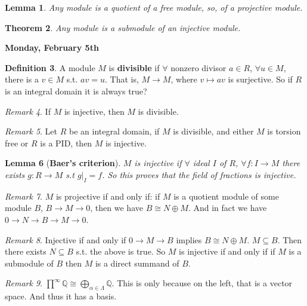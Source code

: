\documentclass[12pt]{amsbook}
\theoremstyle{plain}
\newtheorem{theorem}{Theorem}[chapter]
\numberwithin{section}{chapter}
\numberwithin{equation}{chapter}
\newtheorem{lem}[theorem]{Lemma}
\theoremstyle{definition}
\newtheorem{Def}[theorem]{Definition}
\theoremstyle{remark}
\newtheorem{rem}[theorem]{Remark}
\newcommand{\sub}{\subseteq}
\newcommand{\Q}{\mathbb{Q}}
\begin{document}
\begin{lem}
Any module is a quotient of a free module, so, of a projective module. 
\end{lem}

\begin{theorem}
Any module is a submodule of an injective module. 
\end{theorem}


\textbf{Monday, February 5th}


\begin{Def}
A module $M$ is \textbf{divisible} if $\forall$ nonzero divisor $a \in R$, $\forall u \in M$, there is a $v \in M$ s.t. $av = u$. That is, $M  \to M$, where $v \mapsto av$ is surjective. So if $R$ is an integral domain it is always true?
\end{Def}

\begin{rem}
If $M$ is injective, then $M$ is divisible. 
\end{rem}

\begin{rem}
Let $R$ be an integral domain, if $M$ is divisible, and either $M$ is torsion free or $R$ is a PID, then $M$ is injective. 
\end{rem}

\begin{lem}[\textbf{Baer's criterion}]
$M$ is injective if $\forall$ ideal $I$ of $R$, $\forall f: I \to M$ there exists $g:R \to M$ s.t $g|_I = f$. So this proves that the field of fractions is injective. 
\end{lem}

\begin{rem}
$M$ is projective if and only if: if $M$ is a quotient module of some module $B$, $B \to M \to 0$, then we have $B \cong N \oplus M$. And in fact we have $0 \to N \to B \to M \to 0$. 
\end{rem}

\begin{rem}
Injective if and only if $0 \to M \to B$ implies $B \cong N \oplus M$. $M \sub B$. Then there exists $N \sub B$ s.t. the above is true. So $M$ is injective if and only if if $M$ is a submodule of $B$ then $M$ is a direct summand of $B$. 
\end{rem}

\begin{rem}
$\prod^\infty \Q \cong \bigoplus_{\alpha \in \Lambda}\Q$. This is only because on the left, that is a vector space. And thus it has a basis. 
\end{rem}
\end{document}
